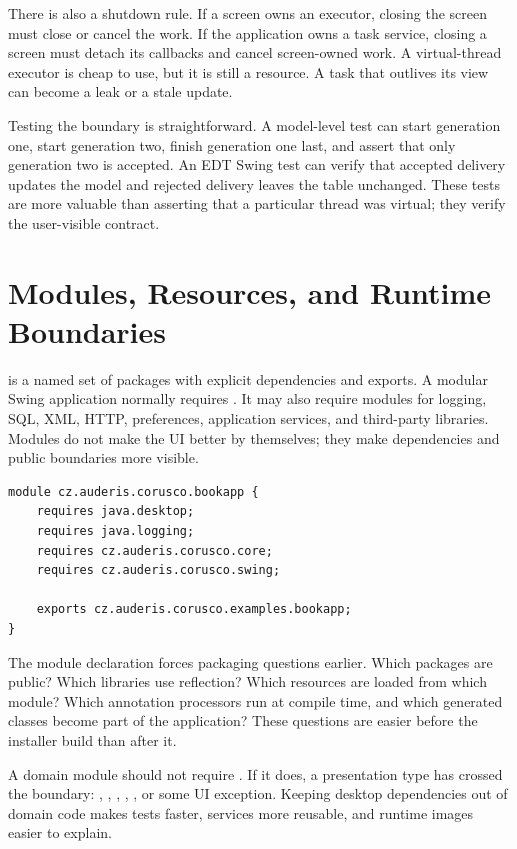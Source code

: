 There is also a shutdown rule. If a screen owns an executor, closing the screen must close or cancel the work. If the application owns a task service, closing a screen must detach its callbacks and cancel screen-owned work. A virtual-thread executor is cheap to use, but it is still a resource. A task that outlives its view can become a leak or a stale update.

Testing the boundary is straightforward. A model-level test can start generation one, start generation two, finish generation one last, and assert that only generation two is accepted. An EDT Swing test can verify that accepted delivery updates the model and rejected delivery leaves the table unchanged. These tests are more valuable than asserting that a particular thread was virtual; they verify the user-visible contract.

\section{Modules, Resources, and Runtime Boundaries}

 is a named set of packages with explicit dependencies and exports. A modular Swing application normally requires . It may also require modules for logging, SQL, XML, HTTP, preferences, application services, and third-party libraries. Modules do not make the UI better by themselves; they make dependencies and public boundaries more visible.

\begin{lstlisting}[caption={A small module declaration for a Swing application.}]
module cz.auderis.corusco.bookapp {
    requires java.desktop;
    requires java.logging;
    requires cz.auderis.corusco.core;
    requires cz.auderis.corusco.swing;

    exports cz.auderis.corusco.examples.bookapp;
}
\end{lstlisting}

The module declaration forces packaging questions earlier. Which packages are public? Which libraries use reflection? Which resources are loaded from which module? Which annotation processors run at compile time, and which generated classes become part of the application? These questions are easier before the installer build than after it.

A domain module should not require . If it does, a presentation type has crossed the boundary: , , , , , or some UI exception. Keeping desktop dependencies out of domain code makes tests faster, services more reusable, and runtime images easier to explain.

